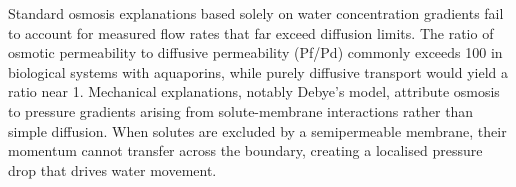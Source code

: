 Standard osmosis explanations based solely on water concentration gradients fail to account for measured flow rates that far exceed diffusion limits. The ratio of osmotic permeability to diffusive permeability (Pf/Pd) commonly exceeds 100 in biological systems with aquaporins, while purely diffusive transport would yield a ratio near 1. Mechanical explanations, notably Debye's model, attribute osmosis to pressure gradients arising from solute-membrane interactions rather than simple diffusion. When solutes are excluded by a semipermeable membrane, their momentum cannot transfer across the boundary, creating a localised pressure drop that drives water movement.
